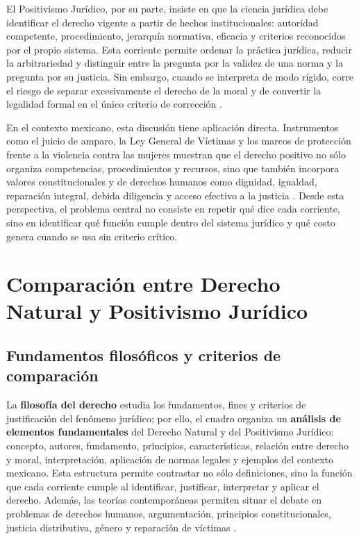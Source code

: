 \documentclass[
	spanish, %
	letterpaper, oneside
]{article}
\begin{document}
El Positivismo Jurídico, por su parte, insiste en que la ciencia jurídica debe identificar el derecho vigente a partir de hechos institucionales: autoridad competente, procedimiento, jerarquía normativa, eficacia y criterios reconocidos por el propio sistema. Esta corriente permite ordenar la práctica jurídica, reducir la arbitrariedad y distinguir entre la pregunta por la validez de una norma y la pregunta por su justicia. Sin embargo, cuando se interpreta de modo rígido, corre el riesgo de separar excesivamente el derecho de la moral y de convertir la legalidad formal en el único criterio de corrección \citep{rojas-gonzalezFilosofiaDerecho2018,ruizrodriguezFilosofiaDerecho2009}.

En el contexto mexicano, esta discusión tiene aplicación directa. Instrumentos como el juicio de amparo, la Ley General de Víctimas y los marcos de protección frente a la violencia contra las mujeres muestran que el derecho positivo no sólo organiza competencias, procedimientos y recursos, sino que también incorpora valores constitucionales y de derechos humanos como dignidad, igualdad, reparación integral, debida diligencia y acceso efectivo a la justicia \citep{LeyAmparoReglamentaria,LeyGeneralVictimas,franzoniacevedoLeyGeneralAcceso2017}. Desde esta perspectiva, el problema central no consiste en repetir qué dice cada corriente, sino en identificar qué función cumple dentro del sistema jurídico y qué costo genera cuando se usa sin criterio crítico.

\section{Comparación entre Derecho Natural y Positivismo Jurídico}

	\subsection{Fundamentos filosóficos y criterios de comparación}

La \textbf{filosofía del derecho} estudia los fundamentos, fines y criterios de justificación del fenómeno jurídico; por ello, el cuadro organiza un \textbf{análisis de elementos fundamentales} del Derecho Natural y del Positivismo Jurídico: concepto, autores, fundamento, principios, características, relación entre derecho y moral, interpretación, aplicación de normas legales y ejemplos del contexto mexicano. Esta estructura permite contrastar no sólo definiciones, sino la función que cada corriente cumple al identificar, justificar, interpretar y aplicar el derecho. Además, las teorías contemporáneas permiten situar el debate en problemas de derechos humanos, argumentación, principios constitucionales, justicia distributiva, género y reparación de víctimas \citep{rojas-gonzalezFilosofiaDerecho2018,lovonManualPracticoFilosofia2020}.
\end{document}
